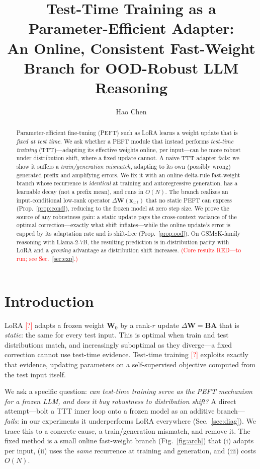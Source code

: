 \documentclass{article}       %
\title{Test-Time Training as a Parameter-Efficient Adapter:\\ An Online, Consistent Fast-Weight Branch for OOD-Robust LLM Reasoning}
\author{Hao Chen \todocite}
\date{}
\newcommand{\todocite}{\textcolor{red}{[?]}}
\newcommand{\x}{\bm{x}}\newcommand{\q}{\bm{q}}\newcommand{\bk}{\bm{k}}\newcommand{\vv}{\bm{v}}
\newcommand{\W}{\bm{W}}\newcommand{\B}{\bm{B}}\newcommand{\SM}{\bm{S}}
\begin{document}
\maketitle

\begin{abstract}
Parameter-efficient fine-tuning (PEFT) such as LoRA learns a weight update that is \emph{fixed at test time}. We ask
whether a PEFT module that instead performs \emph{test-time training} (TTT)---adapting its effective weights online, per
input---can be more robust under distribution shift, where a fixed update cannot. A naive TTT adapter fails: we show it
suffers a \emph{train/generation mismatch}, adapting to its own (possibly wrong) generated prefix and amplifying errors. We
fix it with an online delta-rule fast-weight branch whose recurrence is \emph{identical} at training and autoregressive
generation, has a learnable decay (not a prefix mean), and runs in $O(N)$. The branch realizes an input-conditional
low-rank operator $\Delta\W(\x_{1:t})$ that no static PEFT can express (Prop.~\ref{prop:cond}), reducing to the frozen
model at zero step size. We prove the source of any robustness gain: a static update pays the cross-context variance of the
optimal correction---exactly what shift inflates---while the online update's error is capped by its adaptation rate and is
shift-free (Prop.~\ref{prop:ood}). On GSM8K-family reasoning with Llama-2-7B, the resulting prediction is in-distribution
parity with LoRA and a \emph{growing} advantage as distribution shift increases. \textcolor{red}{(Core results RED---to
run; see Sec.~\ref{sec:exp}.)}
\end{abstract}

\section{Introduction}
LoRA \todocite{} adapts a frozen weight $\W_0$ by a rank-$r$ update $\Delta\W=\B\bm{A}$ that is \emph{static}: the same for
every test input. This is optimal when train and test distributions match, and increasingly suboptimal as they diverge---a
fixed correction cannot use test-time evidence. Test-time training \todocite{} exploits exactly that evidence, updating
parameters on a self-supervised objective computed from the test input itself.

We ask a specific question: \emph{can test-time training serve as the PEFT mechanism for a frozen LLM, and does it buy
robustness to distribution shift?} A direct attempt---bolt a TTT inner loop onto a frozen model as an additive branch---
\emph{fails}: in our experiments it underperforms LoRA everywhere (Sec.~\ref{sec:diag}). We trace this to a concrete cause,
a train/generation mismatch, and remove it. The fixed method is a small online fast-weight branch (Fig.~\ref{fig:arch}) that (i) adapts per
input, (ii) uses the \emph{same} recurrence at training and generation, and (iii) costs $O(N)$.
\end{document}
